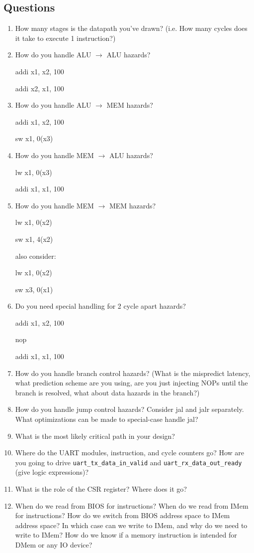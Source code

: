 \documentclass[11pt]{article}
\begin{document}
\subsection{Questions}\label{sec:chkpt1_questions}
\begin{enumerate}
\item How many stages is the datapath you've drawn? (i.e. How many cycles does it take to execute 1 instruction?)
\item How do you handle ALU $\rightarrow$ ALU hazards?

addi x1, x2, 100

addi x2, x1, 100

\item How do you handle ALU $\rightarrow$ MEM hazards?

addi x1, x2, 100

sw x1, 0(x3)

\item How do you handle MEM $\rightarrow$ ALU hazards?

lw x1, 0(x3)

addi x1, x1, 100

\item How do you handle MEM $\rightarrow$ MEM hazards?

lw x1, 0(x2)

sw x1, 4(x2)

also consider:

lw x1, 0(x2)

sw x3, 0(x1)

\item Do you need special handling for 2 cycle apart hazards?

addi x1, x2, 100

 nop

 addi x1, x1, 100

\item How do you handle branch control hazards? (What is the mispredict latency, what prediction scheme are you using, are you just injecting NOPs until the branch is resolved, what about data hazards in the branch?)
\item How do you handle jump control hazards? Consider jal and jalr separately. What optimizations can be made to special-case handle jal? 
\item What is the most likely critical path in your design?
\item Where do the UART modules, instruction, and cycle counters go? How are you going to drive \verb|uart_tx_data_in_valid| and \verb|uart_rx_data_out_ready| (give logic expressions)?
\item What is the role of the CSR register? Where does it go?
\item When do we read from BIOS for instructions? When do we read from IMem for instructions? How do we switch from BIOS address space to IMem address space? In which case can we write to IMem, and why do we need to write to IMem? How do we know if a memory instruction is intended for DMem or any IO device?
\end{enumerate}
\end{document}
